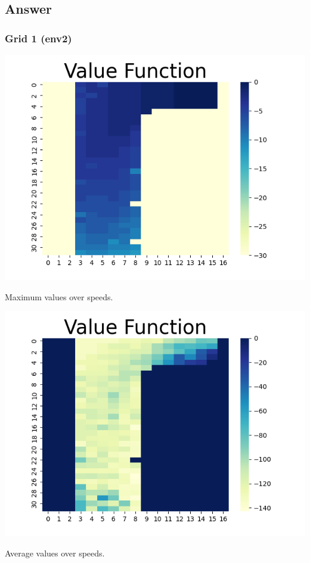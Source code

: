 \documentclass[11pt]{article}
\begin{document}
    \subsection*{Answer}

    \subsubsection*{Grid 1 (env2)}

    \includegraphics[scale=0.7]{env2_5_3_1_max}

    Maximum values over speeds.

    \includegraphics[scale=0.7]{env2_5_3_1_avg}

    Average values over speeds.
\end{document}
